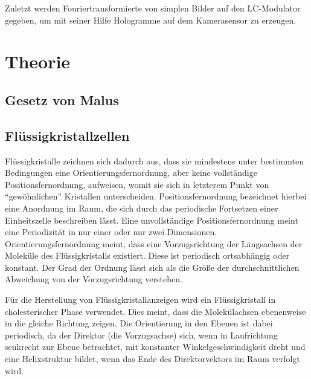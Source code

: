 \documentclass[
	a4paper,
	12pt,
	pagesize,
	ngerman
]{scrartcl}
\begin{document}
	Zuletzt werden Fouriertransformierte von simplen Bilder auf den LC-Modulator gegeben, um mit seiner Hilfe Hologramme auf dem Kamerasensor zu erzeugen.

  \section{Theorie}

	\subsection{Gesetz von Malus}

	\subsection{Flüssigkristallzellen}

	Flüssigkristalle zeichnen sich dadurch aus, dass sie mindestens unter bestimmten Bedingungen eine Orientierungsfernordnung, aber keine vollständige Positionsfernordnung, aufweisen, womit sie sich in letzterem Punkt von \enquote{gewöhnlichen} Kristallen unterscheiden.
	Positionsfernordnung bezeichnet hierbei eine Anordnung im Raum, die sich durch das periodische Fortsetzen einer Einheitszelle beschreiben lässt.
	Eine unvollständige Positionsfernordnung meint eine Periodizität in nur einer oder nur zwei Dimensionen.
	Orientierungsfernordnung meint, dass eine Vorzugsrichtung der Längsachsen der Moleküle des Flüssigkristalls existiert.
	Diese ist periodisch ortsabhängig oder konstant.
	Der Grad der Ordnung lässt sich als die Größe der durchschnittlichen Abweichung von der Vorzugsrichtung verstehen.

	Für die Herstellung von Flüssigkristallanzeigen wird ein Flüssigkristall in cholesterischer Phase verwendet. %
	Dies meint, dass die Molekülachsen ebenenweise in die gleiche Richtung zeigen.
	Die Orientierung in den Ebenen ist dabei periodisch, da der Direktor (die Vorzugsachse) sich, wenn in Laufrichtung senkrecht zur Ebene betrachtet, mit konstanter Winkelgeschwindigkeit dreht und  eine Helixstruktur bildet, wenn das Ende des Direktorvektors im Raum verfolgt wird.
\end{document}

